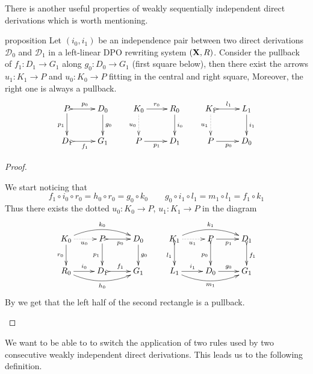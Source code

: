 \documentclass[a4paper,UKenglish,cleveref,pdftex, thm-restate,numberwithinsect]{lipics}
\def\R{\mathsf{R}}
\def\X{\textbf {\textup{X}}}
\newcommand{\dder}[1]{\mathscr{#1}}
\begin{document}
There is another useful properties of weakly sequentially independent direct derivations which is worth mentioning.

\begin{theoremEnd}[category=sec3]{proposition}\label{prop:tec}
	Let $(i_0, i_1)$ be an independence pair between two direct derivations $\dder{D}_0$ and $\dder{D}_1$ in a left-linear DPO rewriting system $(\X,\R)$. Consider the pullback of $f_1\colon D_1\to G_1$ along $g_0\colon D_0\to G_1$ (first square below),  then there exist the arrows $u_1\colon K_1\to P$ and $u_0\colon K_0\to P$ fitting in the central and right square, Moreover, the right one is always a pullback.
	\[\xymatrix{P \ar@{>->}[r]^{p_0} \ar[d]_{p_1} & D_0 \ar[d]^{g_0}& K_0 \ar[r]^{r_0}  \ar@{.>}[d]_{u_0}& R_0 \ar[d]^{i_0} & K_1 \ar@{>->}[r]^{l_1}  \ar@{.>}[d]_{u_1}& L_1 \ar[d]^{i_1}\\  D_1 \ar@{>->}[r]_{f_1} &G_1 &P \ar[r]_{p_1} & D_1 &P \ar[r]_{p_0}  & D_0}\]
\end{theoremEnd}
\begin{proof}
	\begin{proofEnd}
We start noticing that
\[
f_1\circ i_0\circ r_0=h_0\circ r_0=g_0\circ k_0 \qquad g_0\circ i_1\circ l_1=m_1\circ l_1= f_1 \circ k_1 \] 
Thus there exists the dotted $u_0\colon K_0\to P$, $u_1\colon K_1\to P$  in the diagram
\[\xymatrix{K_0 \ar[d]_{r_0} \ar@{.>}[r]_{u_0}\ar@/^.4cm/[rr]^{k_0} &P \ar@{>->}[r]_{p_0} \ar[d]_{p_1}& D_0 \ar[d]^{g_0}&K_1 \ar@{>->}[d]_{l_1} \ar@{.>}[r]_{u_1}\ar@/^.4cm/[rr]^{k_1} &P \ar[r]_{p_1} \ar@{>->}[d]_{p_0}& D_1 \ar@{>->}[d]^{f_1}\\R_0 \ar@/_.4cm/[rr]_{h_0}\ar[r]^{i_0}& D_1 \ar@{>->}[r]^{f_1}& G_1&L_1 \ar@/_.4cm/[rr]_{m_1}\ar[r]^{i_1}& D_0 \ar[r]^{g_0}& G_1}\]
By  we get that the left half of the second rectangle is a pullback. 
	\end{proofEnd} \qedhere 
\end{proof}

We want to be able to to switch the application of two rules used by two consecutive weakly independent direct derivations. This leads us to the following definition.
\end{document}
